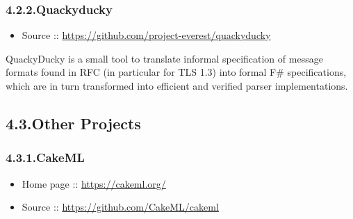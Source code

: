 \documentclass[12pt,twoside]{article}
\begin{document}
\subsubsection{4.2.2.\hspace*{0.5em}Quackyducky}\label{sec-quackyducky}%

\begin{itemize}[noitemsep,topsep=\mdcompacttopsep]%

\item{}Source :: \href{https://github.com/project-everest/quackyducky}{{\ttfamily https://\hspace{0pt}github.\hspace{0pt}com/\hspace{0pt}project-\hspace{0pt}everest/\hspace{0pt}quackyducky}}%
\end{itemize}%

\noindent{}QuackyDucky is a small tool to translate informal specification of
message formats found in RFC (in particular for TLS 1.3) into formal
F\# specifications, which are in turn transformed into efficient and
verified parser implementations.%

\subsection{4.3.\hspace*{0.5em}Other Projects}\label{sec-other-projects}%

\subsubsection{4.3.1.\hspace*{0.5em}CakeML}\label{sec-cakeml}%

\begin{itemize}[noitemsep,topsep=\mdcompacttopsep]%

\item{}Home page :: \href{https://cakeml.org/}{{\ttfamily https://\hspace{0pt}cakeml.\hspace{0pt}org/\hspace{0pt}}}%

\item{}Source :: \href{https://github.com/CakeML/cakeml}{{\ttfamily https://\hspace{0pt}github.\hspace{0pt}com/\hspace{0pt}CakeML/\hspace{0pt}cakeml}}%
\end{itemize}%
\end{document}
